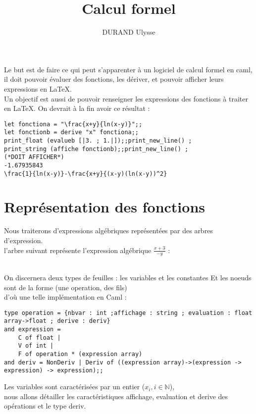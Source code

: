 \documentclass{article}
\title{Calcul formel}
\author{DURAND Ulysse}
\date{}
\theoremstyle{definition}
\begin{document}
\maketitle
Le but est de faire ce qui peut s'apparenter \`a un logiciel de calcul formel en caml, il doit pouvoir \'evaluer des fonctions, les d\'eriver, et pouvoir afficher leurs expressions en \LaTeX.\\
Un objectif est aussi de pouvoir renseigner les expressions des fonctions \`a traiter en \LaTeX.
On devrait \`a la fin avoir ce r\'esultat : 
\begin{lstlisting}
let fonctiona = "\frac{x+y}{ln(x-y)}";;
let fonctionb = derive "x" fonctiona;;
print_float (evalueb [|3. ; 1.|]);;print_new_line() ;
print_string (affiche fonctionb);;print_new_line() ;
(*DOIT AFFICHER*)
-1.67935843
\frac{1}{ln(x-y)}-\frac{x+y}{(x-y)(ln(x-y))^2}
\end{lstlisting}

\section {Repr\'esentation des fonctions}
Nous traiterons d'expressions alg\'ebriques repr\'esent\'ees par des arbres d'expression.\\

l'arbre suivant repr\'esente l'expression alg\'ebrique $\frac{x+3}{-y}$ : \\

\\
On discernera deux types de feuilles : les variables et les constantes
Et les noeuds sont de la forme (une operation, des fils)\\
d'o\`u une telle impl\'ementation en Caml :
\begin{lstlisting}
type operation = {nbvar : int ;affichage : string ; evaluation : float array->float ; derive : deriv}
and expression = 
    C of float |
    V of int |
    F of operation * (expression array)
and deriv = NonDeriv | Deriv of ((expression array)->(expression -> expression) -> expression);;
\end{lstlisting}
Les variables sont caract\'eris\'ees par un entier ($x_i, i\in\mathbb{N}$),\\ nous allons d\'etailler les caract\'eristiques affichage, evaluation et derive des op\'erations et le type deriv.\\
\end{document}
